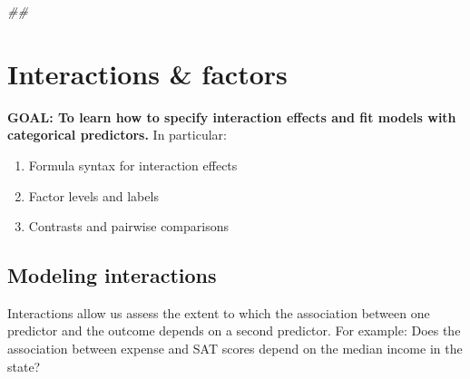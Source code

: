 \documentclass[
]{book}
\newenvironment{Shaded}{\begin{snugshade}}{\end{snugshade}}
\newcommand{\CommentTok}[1]{\textcolor[rgb]{0.56,0.35,0.01}{\textit{#1}}}
\newcommand{\DataTypeTok}[1]{\textcolor[rgb]{0.13,0.29,0.53}{#1}}
\newcommand{\DecValTok}[1]{\textcolor[rgb]{0.00,0.00,0.81}{#1}}
\newcommand{\KeywordTok}[1]{\textcolor[rgb]{0.13,0.29,0.53}{\textbf{#1}}}
\newcommand{\NormalTok}[1]{#1}
\newcommand{\OperatorTok}[1]{\textcolor[rgb]{0.81,0.36,0.00}{\textbf{#1}}}
\newcommand{\StringTok}[1]{\textcolor[rgb]{0.31,0.60,0.02}{#1}}
\providecommand{\tightlist}{%
  \setlength{\itemsep}{0pt}\setlength{\parskip}{0pt}}
\begin{document}
\begin{Shaded}
\begin{Highlighting}[]
\CommentTok{## }
\end{Highlighting}
\end{Shaded}

\hypertarget{interactions-factors}{%
\section{Interactions \& factors}\label{interactions-factors}}

\textbf{GOAL: To learn how to specify interaction effects and fit models with categorical predictors.} In particular:

\begin{enumerate}
\def\labelenumi{\arabic{enumi}.}
\tightlist
\item
  Formula syntax for interaction effects
\item
  Factor levels and labels
\item
  Contrasts and pairwise comparisons
\end{enumerate}

\hypertarget{modeling-interactions}{%
\subsection{Modeling interactions}\label{modeling-interactions}}

Interactions allow us assess the extent to which the association between one predictor and the outcome depends on a second predictor. For example: Does the association between expense and SAT scores depend on the median income in the state?

\begin{Shaded}
\end{Shaded}
\end{document}
